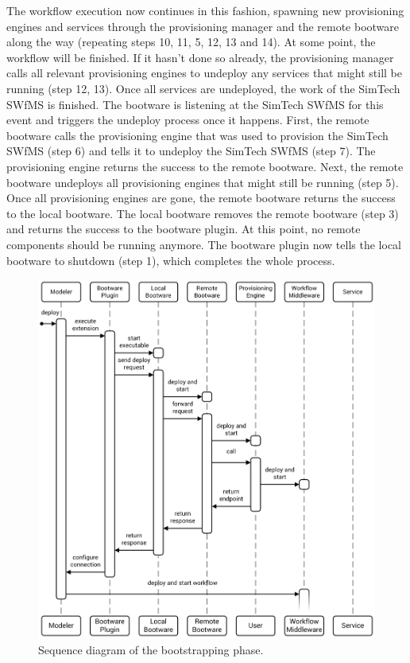 The workflow execution now continues in this fashion, spawning new provisioning engines and services through the provisioning manager and the remote bootware along the way (repeating steps 10, 11, 5, 12, 13 and 14).
At some point, the workflow will be finished.
If it hasn't done so already, the provisioning manager calls all relevant provisioning engines to undeploy any services that might still be running (step 12, 13).
Once all services are undeployed, the work of the SimTech SWfMS is finished.
The bootware is listening at the SimTech SWfMS for this event and triggers the undeploy process once it happens.
First, the remote bootware calls the provisioning engine that was used to provision the SimTech SWfMS (step 6) and tells it to undeploy the SimTech SWfMS (step 7).
The provisioning engine returns the success to the remote bootware.
Next, the remote bootware undeploys all provisioning engines that might still be running (step 5).
Once all provisioning engines are gone, the remote bootware returns the success to the local bootware.
The local bootware removes the remote bootware (step 3) and returns the success to the bootware plugin.
At this point, no remote components should be running anymore.
The bootware plugin now tells the local bootware to shutdown (step 1), which completes the whole process.

\begin{figure}[!htbp]
	\centering
	\includegraphics[resolution=600]{process/assets/bootstrapping_sequence}
	\caption{Sequence diagram of the bootstrapping phase.}
	\label{image:startup_sequence}
\end{figure}

